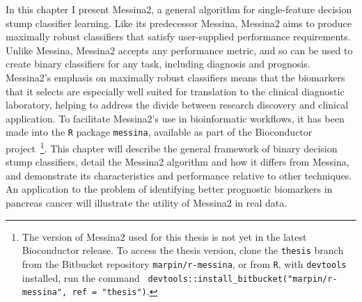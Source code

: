 \documentclass[dissertation.tex]{subfiles}
\begin{document}
In this chapter I present Messina2, a general algorithm for single-feature decision stump classifier learning.  Like its predecessor Messina, Messina2 aims to produce maximally robust classifiers that satisfy user-supplied performance requirements.  Unlike Messina, Messina2 accepts any performance metric, and so can be used to create binary classifiers for any task, including diagnosis and prognosis.  Messina2's emphasis on maximally robust classifiers means that the biomarkers that it selects are especially well suited for translation to the clinical diagnostic laboratory, helping to address the divide between research discovery and clinical application.  To facilitate Messina2's use in bioinformatic workflows, it has been made into the \texttt{R} package \texttt{messina}, available as part of the Bioconductor project~\cite{Gentleman2004}\footnote{The version of Messina2 used for this thesis is not yet in the latest Bioconductor release.  To access the thesis version, clone the \texttt{thesis} branch from the Bitbucket repository \texttt{marpin/r-messina}, or from \texttt{R}, with \texttt{devtools} installed, run the command \texttt{ devtools::install\_bitbucket("marpin/r-messina", ref = "thesis")}.}.  This chapter will describe the general framework of binary decision stump classifiers, detail the Messina2 algorithm and how it differs from Messina, and demonstrate its characteristics and performance relative to other techniques.  An application to the problem of identifying better prognostic biomarkers in pancreas cancer will illustrate the utility of Messina2 in real data.
\end{document}

